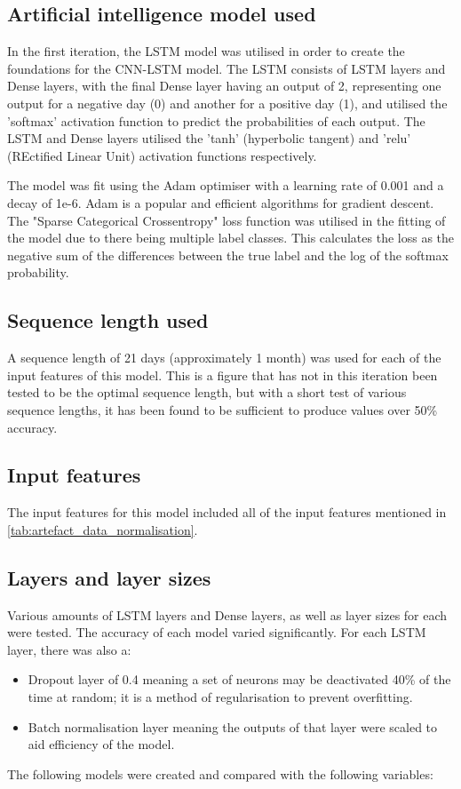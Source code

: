 \subsection{Artificial intelligence model used}\label{ssec:iteration1_ai_model}
In the first iteration, the LSTM model was utilised in order to create the foundations for the CNN-LSTM model. The LSTM
consists of LSTM layers and Dense layers, with the final Dense layer having an output of 2, representing one output for
a negative day (0) and another for a positive day (1), and utilised the 'softmax' activation function to predict the
probabilities of each output. The LSTM and Dense layers utilised the 'tanh' (hyperbolic tangent) and 'relu'
(REctified Linear Unit) activation functions respectively.

The model was fit using the Adam optimiser with a learning rate of 0.001 and a decay of 1e-6. Adam is a popular
and efficient algorithms for gradient descent.
The "Sparse Categorical Crossentropy" loss function was utilised in the fitting of the model due to there being multiple
label classes. This calculates the loss as the negative sum of the differences between the true label and the log of the softmax
probability.

\subsection{Sequence length used}
A sequence length of 21 days (approximately 1 month) was used for each of the input features of this model.
This is a figure that has not in this iteration been tested to be the optimal sequence length, but with a short
test of various sequence lengths, it has been found to be sufficient to produce values over 50\% accuracy.
\subsection{Input features}
The input features for this model included all of the input features mentioned in \autoref{tab:artefact_data_normalisation}.

\subsection{Layers and layer sizes} \label{ssec:iteration1layers}
Various amounts of LSTM layers and Dense layers, as well as layer sizes for each were tested. The accuracy of each model varied
significantly. For each LSTM layer, there was also a:
\begin{itemize}
    \item Dropout layer of 0.4 meaning a set of neurons may be
    deactivated 40\% of the time at random; it is a method of regularisation to prevent overfitting.
    \item Batch normalisation layer meaning the outputs of that layer were scaled to aid efficiency of the model.
\end{itemize}
The following models were created and compared with the following variables:

